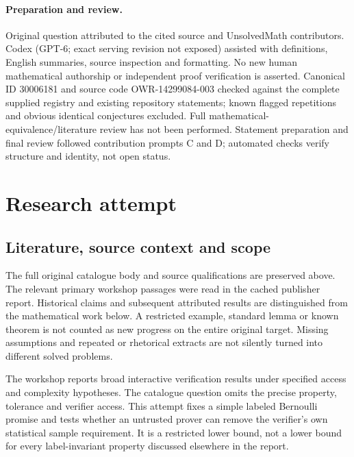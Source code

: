 \documentclass[11pt]{article}
\begin{document}
\paragraph{Preparation and review.}
Original question attributed to the cited source and UnsolvedMath contributors. Codex (GPT-6; exact serving revision not exposed) assisted with definitions, English summaries, source inspection and formatting. No new human mathematical authorship or independent proof verification is asserted. Canonical ID 30006181 and source code OWR-14299084-003 checked against the complete supplied registry and existing repository statements; known flagged repetitions and obvious identical conjectures excluded. Full mathematical-equivalence/literature review has not been performed. Statement preparation and final review followed contribution prompts C and D; automated checks verify structure and identity, not open status.
\label{end:30006181}

\section{Research attempt}
\subsection{Literature, source context and scope}
The full original catalogue body and source qualifications are preserved above. The relevant primary workshop passages were read in the cached publisher report. Historical claims and subsequent attributed results are distinguished from the mathematical work below. A restricted example, standard lemma or known theorem is not counted as new progress on the entire original target. Missing assumptions and repeated or rhetorical extracts are not silently turned into different solved problems.

The workshop reports broad interactive verification results under specified access and complexity hypotheses. The catalogue question omits the precise property, tolerance and verifier access. This attempt fixes a simple labeled Bernoulli promise and tests whether an untrusted prover can remove the verifier's own statistical sample requirement. It is a restricted lower bound, not a lower bound for every label-invariant property discussed elsewhere in the report.
\end{document}
